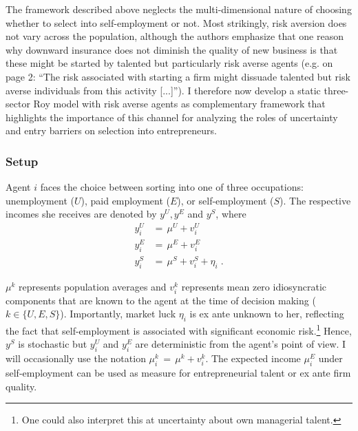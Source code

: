 The framework described above neglects the multi-dimensional nature of choosing whether to select into self-employment or not. Most strikingly, risk aversion does not vary across the population, although the authors emphasize that one reason why downward insurance does not diminish the quality of new business is that these might be started by talented but particularly risk averse agents (e.g. on page 2: ``The risk associated with starting a firm might dissuade
talented but risk averse individuals from this activity [...]''). I therefore now develop a static three-sector Roy model with risk averse agents as complementary framework that highlights the importance of this channel for analyzing the roles of uncertainty and entry barriers on selection into entrepreneurs.

\subsubsection*{Setup}

Agent $i$ faces the choice between sorting into one of three occupations: unemployment ($U$), paid employment ($E$), or self-employment ($S$). The respective incomes she receives are denoted by $y^U, y^E$ and $y^S$, where
\begin{align}
y^U_i & = \, \mu^U + v_i^U \\[3pt]
y^E_i & = \, \mu^E + v_i^E \\[3pt]
y^S_i & = \, \mu^S + v_i^S + \eta_i \; .
\end{align}

\noindent $\mu^k$ represents population averages and $v_i^k$ represents mean zero idiosyncratic components  that are known to the agent at the time of decision making ($k \in \{U, E, S\}$). Importantly, market luck $\eta_i$ is ex ante unknown to her, reflecting the fact that self-employment is associated with significant economic risk.\footnote{One could also interpret this at uncertainty about own managerial talent.} Hence, $y^S$ is stochastic but $y^U_i$ and $y^E_i$ are deterministic from the agent's point of view. I will occasionally use the notation $\mu_i^k \, = \, \mu^k + v_i^k$. The expected income $\mu_i^E$ under self-employment can be used as measure for entrepreneurial talent or ex ante firm quality.

